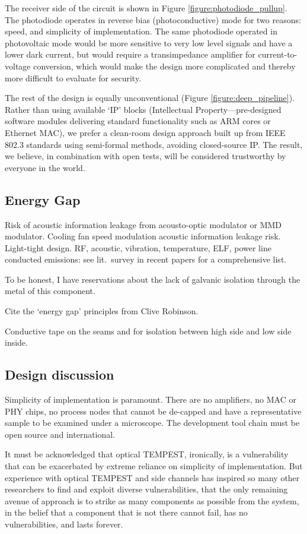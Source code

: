 \documentclass[conference]{IEEEtran}
\begin{document}
The receiver side of the circuit is shown in Figure
\ref{figure:photodiode_pullup}. The photodiode operates in reverse bias
(photoconductive) mode for two reasons: speed, and simplicity of
implementation. The same photodiode operated in photovoltaic mode would be
more sensitive to very low level signals and have a lower dark current, but
would require a transimpedance amplifier for current-to-voltage conversion,
which would make the design more complicated and thereby more difficult to
evaluate for security.

The rest of the design is equally unconventional (Figure
\ref{figure:deep_pipeline}). Rather than using available `IP' blocks
(Intellectual Property---pre-designed software modules delivering standard
functionality such as ARM cores or Ethernet MAC), we prefer a clean-room
design approach built up from IEEE 802.3 standards using semi-formal methods,
avoiding closed-source IP. The result, we believe, in combination with open
tests, will be considered trustworthy by everyone in the world.

\subsection{Energy Gap}

Risk of acoustic information leakage from acousto-optic modulator or MMD
modulator. Cooling fan speed modulation acoustic information leakage risk.
Light-tight design. RF, acoustic, vibration, temperature, ELF, power line
conducted emissions: see lit.\ survey in recent papers for a comprehensive
list.

To be honest, I have reservations about the lack of galvanic isolation
through the metal of this component.

Cite the `energy gap' principles from Clive Robinson.

Conductive tape on the seams and for isolation between high side and low side
inside.

\subsection{Design discussion}

Simplicity of implementation is paramount. There are no amplifiers, no MAC
or PHY chips, no process nodes that cannot be de-capped and have a
representative sample to be examined under a microscope. The development tool
chain must be open source and international.

It must be acknowledged that optical TEMPEST, ironically, is a vulnerability
that can be exacerbated by extreme reliance on simplicity of implementation.
But experience with optical TEMPEST and side channels has inspired so many
other researchers to find and exploit diverse vulnerabilities, that the only
remaining avenue of approach is to strike as many components as possible from
the system, in the belief that a component that is not there cannot fail, has
no vulnerabilities, and lasts forever.
\end{document}
